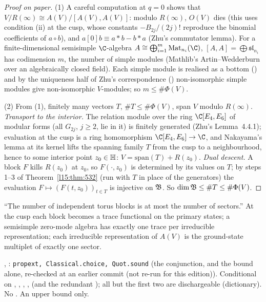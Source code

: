 \begin{proof}[Proof on paper]
(1) A careful computation at $q=0$ shows that $V/R(\infty)\cong A(V)/[A(V),A(V)]$: modulo $R(\infty)$, $O(V)$ dies (this uses
condition (ii) at the cusp, whose constants $-B_{2j}/(2j)!$ reproduce the binomial coefficients of $a\circ b$), and
$a[0]b\equiv a*b-b*a$ (Zhu's commutator lemma). For a finite-dimensional semisimple $\C$-algebra
$A\cong\bigoplus_{i=1}^m\mathrm{Mat}_{n_i}(\C)$, $[A,A]=\bigoplus\mathfrak{sl}_{n_i}$ has codimension $m$, the number of simple
modules (Mathlib's Artin--Wedderburn over an algebraically closed field). Each simple module is realised as a bottom
() and by the uniqueness half of Zhu's correspondence () non-isomorphic simple modules
give non-isomorphic $V$-modules; so $m\le\#\Phi(V)$.

(2) From (1), finitely many vectors $T$, $\#T\le\#\Phi(V)$, span $V$ modulo $R(\infty)$. \emph{Transport to the interior.}
The relation module over the ring $\C[E_4,E_6]$ of modular forms (all $G_{2j}$, $j\ge2$, lie in it) is finitely generated
(Zhu's Lemma~4.4.1); evaluation at the cusp is a ring homomorphism $\C[E_4,E_6]\to\C$, and Nakayama's lemma at its kernel
lifts the spanning family $T$ from the cusp to a neighbourhood, hence to some interior point $z_0\in\mathbb{H}$:
$V=\mathrm{span}(T)+R(z_0)$. \emph{Dual descent.} A block $F$ kills $R(z_0)$ at $z_0$, so $F(\cdot,z_0)$ is determined by its
values on $T$; by steps 1--3 of Theorem~\ref{l15:thm:532} (run with $T$ in place of the generators) the evaluation
$F\mapsto(F(t,z_0))_{t\in T}$ is injective on $\mathfrak{B}$. So $\dim\mathfrak{B}\le\#T\le\#\Phi(V)$.
\end{proof}

\begin{physics}
``The number of independent torus blocks is at most the number of sectors.'' At the cusp each block becomes a trace
functional on the primary states; a semisimple zero-mode algebra has exactly one trace per irreducible representation;
each irreducible representation of $A(V)$ is the ground-state multiplet of exactly one sector.
\end{physics}

\begin{status}
\allowbreak{}\allowbreak{}, \allowbreak{}\allowbreak{}\allowbreak{}:
\texttt{propext, Classical.choice, Quot.sound} (the conjunction, and the bound alone, re-checked at an earlier commit (not re-run for this edition)).
Conditional on , , , ,
 (and the redundant ); all but the first two are dischargeable (dictionary). No . An
upper bound only.
\end{status}

